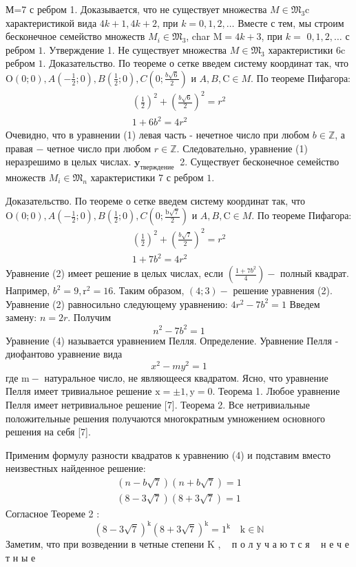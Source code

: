 \documentclass[a4paper,openbib]{article}
\begin{document}
М=7 с ребром 1. Доказывается, что не существует множества $M \in \mathfrak{M}_{3} \mathrm{c}$ характеристикой вида $4 k+1,4 k+2$, при $k=0,1,2, \ldots$ Вместе с тем, мы строим бесконечное семейство множеств $M_{i} \in \mathfrak{M}_{3}$, char $\mathrm{M}=4 k+3$, при $k=$ $0,1,2, \ldots$ с ребром $1 .$
Утверждение 1. Не существует множества $M \in \mathfrak{M}_{3}$ характеристики $6 \mathrm{c}$ ребром $1 .$ Доказательство. По теореме о сетке введем систему координат так, что $\mathrm{O}(0 ; 0), A\left(-\frac{1}{2} ; 0\right), B\left(\frac{1}{2} ; 0\right), C\left(0 ; \frac{b \sqrt{6}}{2}\right)$ и $A, B, \mathrm{C} \in M .$ По теореме
Пифагора:
$$
\begin{array}{c}
\left(\frac{1}{2}\right)^{2}+\left(\frac{b \sqrt{6}}{2}\right)^{2}=r^{2} \\
1+6 b^{2}=4 r^{2}
\end{array}
$$
Очевидно, что в уравнении (1) левая часть - нечетное число при любом $b \in \mathbb{Z}$, а правая $-$ четное число при любом $r \in \mathbb{Z} .$ Следовательно, уравнение
(1) неразрешимо в целых числах. $\mathbf{y}_{\text {тверждение }}$ 2. Существует бесконечное семейство множеств $M_{i} \in \mathfrak{M}_{n}$ характеристики 7 с ребром $1 .$

Доказательство. По теореме о сетке введем систему координат так, что $\mathrm{O}(0 ; 0), A\left(-\frac{1}{2} ; 0\right), B\left(\frac{1}{2} ; 0\right), C\left(0 ; \frac{\mathrm{b} \sqrt{7}}{2}\right)$ и $A, B, \mathrm{C} \in M .$ По теореме
Пифагора:
$$
\begin{array}{c}
\left(\frac{1}{2}\right)^{2}+\left(\frac{b \sqrt{7}}{2}\right)^{2}=r^{2} \\
1+7 b^{2}=4 r^{2}
\end{array}
$$
Уравнение (2) имеет решение в целых числах, если $\left(\frac{1+7 b^{2}}{4}\right)-$ полный квадрат. Например, $b^{2}=9, \mathrm{r}^{2}=16 .$ Таким образом, $(4 ; 3)-$ решение уравнения (2).
Уравнение (2) равносильно следующему уравнению:
$4 r^{2}-7 b^{2}=1$
Введем замену: $n=2 r .$ Получим
$$
n^{2}-7 b^{2}=1
$$
Уравнение (4) называется уравнением Пелля. Определение. Уравнение Пелля - диофантово уравнение вида
$$
x^{2}-m y^{2}=1
$$
где $\mathrm{m}-$ натуральное число, не являющееся квадратом. Ясно, что уравнение Пелля имеет тривиальное решение $\mathrm{x}=\pm 1, \mathrm{y}=0 .$ Теорема 1. Любое уравнение Пелля имеет нетривиальное решение [7]. Теорема 2. Все нетривиальные положительные решения получаются многократным умножением основного решения на себя [7].

Применим формулу разности квадратов к уравнению (4) и подставим вместо неизвестных найденное решение:
$$
\begin{array}{l}
(n-b \sqrt{7})(n+b \sqrt{7})=1 \\
(8-3 \sqrt{7})(8+3 \sqrt{7})=1
\end{array}
$$
Согласное Теореме 2 :
$$
(8-3 \sqrt{7})^{\mathrm{k}}(8+3 \sqrt{7})^{\mathrm{k}}=1^{\mathrm{k}} \quad \mathrm{k} \in \mathbb{N}
$$
Заметим, что при возведении в четные степени \textrm{K} , ~ п о л у ч а ю т с я ~ н е ч е т н ы е ~
\end{document}
